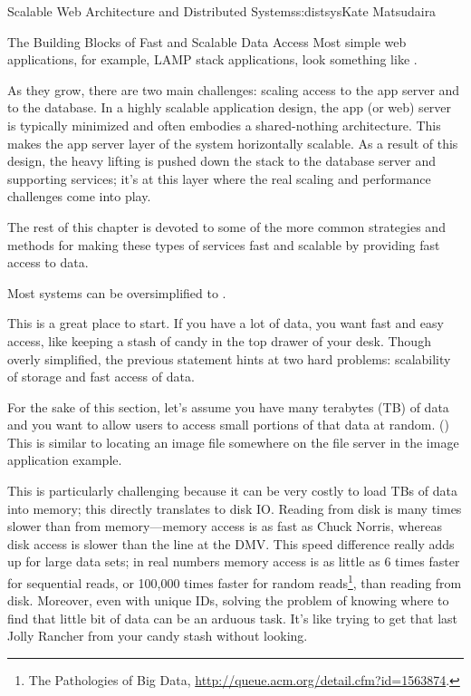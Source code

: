 \begin{aosachapter}{Scalable Web Architecture and Distributed Systems}{s:distsys}{Kate Matsudaira}
\begin{aosasect1}{The Building Blocks of Fast and Scalable Data Access}
Most simple web applications, for example, LAMP stack applications,
look something like .


As they grow, there are two main challenges: scaling access to the
app server and to the database. In a highly scalable application
design, the app (or web) server is typically minimized and often
embodies a shared-nothing architecture. This makes the app server
layer of the system horizontally scalable. As a result of this design,
the heavy lifting is pushed down the stack to the database server and
supporting services; it's at this layer where the real scaling and
performance challenges come into play.

The rest of this chapter is devoted to some of the more common
strategies and methods for making these types of services fast and
scalable by providing fast access to data.

Most systems can be oversimplified to .


This is a great place to start. If you have a lot of data, you want
fast and easy access, like keeping a stash of candy in the top drawer
of your desk. Though overly simplified, the previous statement hints
at two hard problems: scalability of storage and fast access of data.

For the sake of this section, let's assume you have many terabytes (TB)
of data and you want to allow users to access small portions 
of that data at random. () 
This is similar to locating an image file
somewhere on the file server in the image application example.


This is particularly challenging because it can be very costly to load
TBs of data into memory; this directly translates to disk IO. Reading
from disk is many times slower than from memory---memory access is
as fast as Chuck Norris, whereas disk access is slower than the
line at the DMV. This speed difference really adds up for large
data sets; in real numbers memory access is as little as 6 times
faster for sequential reads, or 100,000 times faster for random
reads\footnote{The Pathologies of Big Data,
  \url{http://queue.acm.org/detail.cfm?id=1563874}.}, than reading from
disk. Moreover, even with unique IDs, solving the problem of
knowing where to find that little bit of data can be an arduous
task. It's like 
trying to get that last Jolly Rancher from your candy stash without
looking.


\end{aosasect1}
\end{aosachapter}
